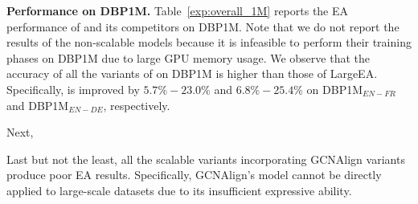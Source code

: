 \noindent
\textbf{Performance on DBP1M.}
Table~\ref{exp:overall_1M} reports the EA performance of \ClusterEA{} and its competitors on DBP1M. Note that we do not report the results of the non-scalable models because it is infeasible to perform their training phases on DBP1M due to large GPU memory usage.
We observe that the accuracy of all the variants of \ClusterEA{} on DBP1M  is higher than those of LargeEA. Specifically, \HitOne{} is improved by $5.7\%-23.0\%$ and $6.8\%-25.4\%$ on DBP1M$_{EN-FR}$ and DBP1M$_{EN-DE}$, respectively.

Next, 

Last but not the least, all the scalable variants incorporating GCNAlign variants produce poor EA results. Specifically, GCNAlign's model cannot be directly applied to large-scale datasets due to its insufficient expressive ability. 



